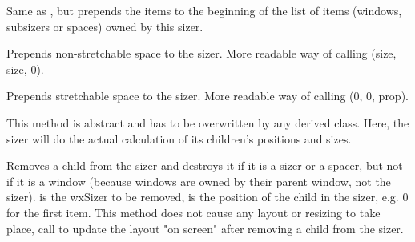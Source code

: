 



Same as , but prepends the items to the beginning of the
list of items (windows, subsizers or spaces) owned by this sizer.


\label{wxsizerprependspacer}


Prepends non-stretchable space to the sizer. More readable way of calling
(size, size, 0).


\label{wxsizerprependstretchspacer}


Prepends stretchable space to the sizer. More readable way of calling
(0, 0, prop).


\label{wxsizerrecalcsizes}


This method is abstract and has to be overwritten by any derived class.
Here, the sizer will do the actual calculation of its children's positions
and sizes.


\label{wxsizerremove}




Removes a child from the sizer and destroys it if it is a sizer or a spacer,
but not if it is a window (because windows are owned by their parent window,
not the sizer).   is the wxSizer to be removed,
 is the position of the child in the sizer, e.g. $0$ for the first item.
This method does not cause any layout or resizing to take place, call
 to update the layout "on screen" after removing a
child from the sizer.

